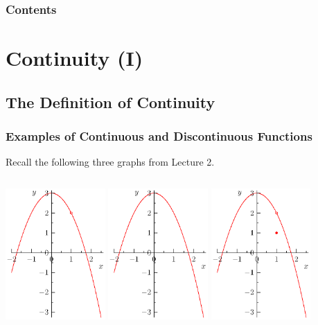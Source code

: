 \documentclass[serif,ignorenonframetext]{beamer}
\title{\commonTitleZeroOneEight}
\subtitle{\commonSubtitleZeroOneEight}
\author{\commonAuthor}
\institute{\commonInstitute}
\date{\commonDateZeroOneEight}
\begin{document}

\begin{frame}
  \titlepage
\end{frame}

\begin{frame}
  \frametitle{Contents}
  \tableofcontents
\end{frame}

\section{Continuity (I)}

\subsection{The Definition of Continuity}

\begin{frame}
  \frametitle{Examples of Continuous and Discontinuous Functions}
  Recall the following three graphs from Lecture 2.
  \begin{columns}
    \includegraphics[height=5cm]{graph5.eps}
    \includegraphics[height=5cm]{graph6.eps}
    \includegraphics[height=5cm]{graph7.eps}
  \end{columns}
\end{frame}
\end{document}
